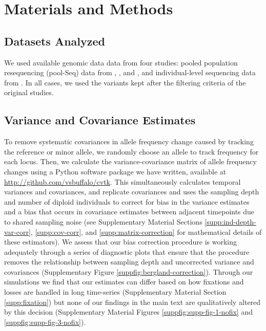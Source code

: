 \documentclass[11pt]{article}
\begin{document}
\section{Materials and Methods}

\subsection{Datasets Analyzed}

We used available genomic data data from four studies: pooled population
resequencing (pool-Seq) data from \textcite{Barghi2019-qy},
\textcite{Kelly2019-dc}, and \textcite{Bergland2014-ij}, and
individual-level sequencing data from \textcite{Castro2019-uk}. In all cases,
we used the variants kept after the filtering criteria of the original studies. 

\subsection{Variance and Covariance Estimates}

To remove systematic covariances in allele frequency change caused by tracking
the reference or minor allele, we randomly choose an allele to track
frequency for each locus. Then, we calculate the variance-covariance
matrix of allele frequency changes using a Python software package we have
written, available at \url{http://github.com/vsbuffalo/cvtk}. This
simultaneously calculates temporal variances and covariances, and replicate
covariances and uses the sampling depth and number of diploid individuals to
correct for bias in the variance estimates and a bias that occurs in covariance
estimates between adjacent timepoints due to shared sampling noise (see
Supplementary Material Sections \ref{supp:ind-depth-var-corr},
\ref{supp:cov-corr}, and \ref{supp:matrix-correction} for mathematical details
of these estimators). We assess that our bias correction procedure is working
adequately through a series of diagnostic plots that ensure that the procedure
removes the relationship between sampling depth and uncorrected variance and
covariances (Supplementary Figure \ref{suppfig:bergland-correction}).  Through
our simulations we find that our estimates can differ based on how fixations
and losses are handled in long time-series (Supplementary Material Section
\ref{supp:fixation}) but none of our findings in the main text are
qualitatively altered by this decision (Supplementary Material Figures
\ref{suppfig:supp-fig-1-nofix} and \ref{suppfig:supp-fig-3-nofix}).
\end{document}
